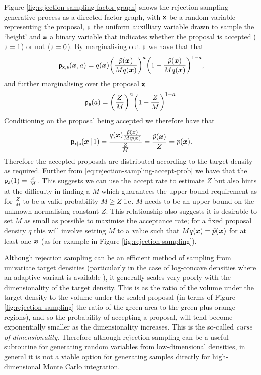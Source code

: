 Figure \ref{fig:rejection-sampling-factor-graph} shows the rejection sampling generative process as a directed factor graph, with $\boldsymbol{\mathsf{x}}$ be a random variable representing the proposal, $\mathsf{u}$ the uniform auxilliary variable drawn to sample the `height' and $\mathsf{a}$ a binary variable that indicates whether the proposal is accepted ($\mathsf{a} = 1$) or not ($\mathsf{a} = 0$). By marginalising out $\mathsf{u}$ we have that that
\begin{equation}\label{eq:rejection-sampling-joint-prob}
  \pden{\rvct{x},\rvar{a}}(\vct{x},a) = 
  q(\vct{x}) \lpa\frac{\utgtdens(\vct{x})}{Mq(\vct{x})}\rpa^a
  \lpa1 - \frac{\utgtdens(\vct{x})}{Mq(\vct{x})}\rpa^{1-a},
\end{equation}
and further marginalising over the proposal $\boldsymbol{\mathsf{x}}$
\begin{equation}\label{eq:rejection-sampling-accept-prob}
  \pden{\rvar{a}}(a) = \lpa\frac{Z}{M}\rpa^a \lpa 1 - \frac{Z}{M}\rpa^{1-a}.
\end{equation}
Conditioning on the proposal being accepted we therefore have that
\begin{equation}
  \mathsf{p}_{\boldsymbol{\mathsf{x}}|\mathsf{a}}(\boldsymbol{x}\operatorname{|} 1) =
  \frac{q(\boldsymbol{x})\frac{\tilde{p}(\boldsymbol{x})}{Mq(\boldsymbol{x})}}{\frac{Z}{M}} = \frac{\tilde{p}(\boldsymbol{x})}{Z} = p(\boldsymbol{x}).
\end{equation}
Therefore the accepted proposals are distributed according to the target density as required. Further from \eqref{eq:rejection-sampling-accept-prob} we have that the $\mathsf{p}_{\mathsf{a}}(1) = \frac{Z}{M}$. This suggests we can use the accept rate to estimate $Z$ but also hints at the difficulty in finding a $M$ which guarantees the upper bound requirement as for $\frac{Z}{M}$ to be a valid probability $M \geq Z$ i.e. $M$ needs to be an upper bound on the unknown normalising constant $Z$. This relationship also suggests it is desirable to set $M$ as small as possible to maximise the acceptance rate; for a fixed proposal density $q$ this will involve setting $M$ to a value such that $M q(\boldsymbol{x}) = \tilde{p}(\boldsymbol{x})$ for at least one $\boldsymbol{x}$ (as for example in Figure \ref{fig:rejection-sampling}).

Although rejection sampling can be an efficient method of sampling from univariate target densities (particularly in the case of log-concave densities where an adaptive variant is available \citep{gilks1992adaptive}), it generally scales very poorly with the dimensionality of the target density. This is as the ratio of the volume under the target density to the volume under the scaled proposal (in terms of Figure \ref{fig:rejection-sampling} the ratio of the green area to the green plus orange regions), and so the probability of accepting a proposal, will tend become exponentially smaller as the dimensionality increases. This is the so-called \emph{curse of dimensionality}. Therefore although rejection sampling can be a useful subroutine for generating random variables from low-dimensional densities, in general it is not a viable option for generating samples directly for high-dimensional Monte Carlo integration.

